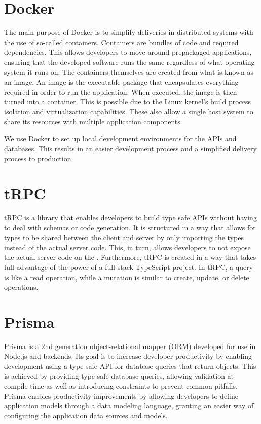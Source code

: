 \section*{Docker}
The main purpose of Docker is to simplify deliveries in distributed systems with the use of so-called containers\cite{Docker_Container}.
Containers are bundles of code and required dependencies. This allows developers to move around prepackaged applications, ensuring that the developed software runs the same regardless of what operating system it runs on\cite{Docker_Container}.
The containers themselves are created from what is known as an image.
An image is the executable package that encapsulates everything required in order to run the application. When executed, the image is then turned into a container.
This is possible due to the Linux kernel's build process isolation and virtualization capabilities. These also allow a single host system to share its resources with multiple application components\cite{Docker_Container}.

We use Docker to set up local development environments for the APIs and databases. This results in an easier development process and a simplified delivery process to production.

\section*{tRPC}
tRPC is a library that enables developers to build type safe APIs without having to deal with schemas or code generation.
It is structured in a way that allows for types to be shared between the client and server by only importing the types instead of the actual server code.
This, in turn, allows developers to not expose the actual server code on the \frontend{}.
Furthermore, tRPC is created in a way that takes full advantage of the power of a full-stack TypeScript project\cite{tRPC}.
In tRPC, a query is like a read operation, while a mutation is similar to create, update, or delete operations.

\section*{Prisma}
Prisma is a 2nd generation object-relational mapper (ORM) developed for use in Node.js and \typescript{} backends.
Its goal is to increase developer productivity by enabling development using a type-safe API for database queries that return \javascript{} objects.
This is achieved by providing type-safe database queries, allowing validation at compile time as well as introducing constraints to prevent common pitfalls\cite{Prisma_Why}.
Prisma enables productivity improvements by allowing developers to define application models through a data modeling language, granting an easier way of configuring the application data sources and models\cite{Prisma_Doc}.

